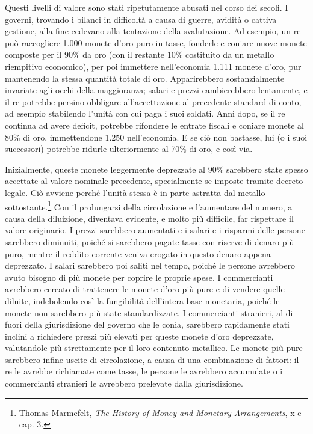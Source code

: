 \documentclass[
  a5paper,
  smalldemyvopaper,10pt,twoside,onecolumn,openright,extrafontsizes,hidelinks]{memoir}
\begin{document}
Questi livelli di valore sono stati ripetutamente abusati nel corso dei
secoli. I governi, trovando i bilanci in difficoltà a causa di guerre,
avidità o cattiva gestione, alla fine cedevano alla tentazione della
svalutazione. Ad esempio, un re può raccogliere 1.000 monete d'oro puro
in tasse, fonderle e coniare nuove monete composte per il 90\% da oro
(con il restante 10\% costituito da un metallo riempitivo economico),
per poi immettere nell'economia 1.111 monete d'oro, pur mantenendo la
stessa quantità totale di oro. Apparirebbero sostanzialmente invariate
agli occhi della maggioranza; salari e prezzi cambierebbero lentamente,
e il re potrebbe persino obbligare all'accettazione al precedente
standard di conto, ad esempio stabilendo l'unità con cui paga i suoi
soldati. Anni dopo, se il re continua ad avere deficit, potrebbe
rifondere le entrate fiscali e coniare monete al 80\% di oro,
immettendone 1.250 nell'economia. E se ciò non bastasse, lui (o i suoi
successori) potrebbe ridurle ulteriormente al 70\% di oro, e così via.

Inizialmente, queste monete leggermente deprezzate al 90\% sarebbero
state spesso accettate al valore nominale precedente, specialmente se
imposte tramite decreto legale. Ciò avviene perché l'unità stessa è in
parte astratta dal metallo sottostante.\footnote{Thomas Marmefelt,
  \emph{The History of Money and Monetary Arrangements}, x e cap. 3.}
Con il prolungarsi della circolazione e l'aumentare del numero, a causa
della diluizione, diventava evidente, e molto più difficile, far
rispettare il valore originario. I prezzi sarebbero aumentati e i salari
e i risparmi delle persone sarebbero diminuiti, poiché si sarebbero
pagate tasse con riserve di denaro più puro, mentre il reddito corrente
veniva erogato in questo denaro appena deprezzato. I salari sarebbero
poi saliti nel tempo, poiché le persone avrebbero avuto bisogno di più
monete per coprire le proprie spese. I commercianti avrebbero cercato di
trattenere le monete d'oro più pure e di vendere quelle diluite,
indebolendo così la fungibilità dell'intera base monetaria, poiché le
monete non sarebbero più state standardizzate. I commercianti stranieri,
al di fuori della giurisdizione del governo che le conia, sarebbero
rapidamente stati inclini a richiedere prezzi più elevati per queste
monete d'oro deprezzate, valutandole più strettamente per il loro
contenuto metallico. Le monete più pure sarebbero infine uscite di
circolazione, a causa di una combinazione di fattori: il re le avrebbe
richiamate come tasse, le persone le avrebbero accumulate o i
commercianti stranieri le avrebbero prelevate dalla giurisdizione.
\end{document}
